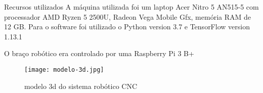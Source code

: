 \begin{frame}[t]{Recursos utilizados} 
    \newcommand\vspacerecursos{0.2cm}
    \transdissolve[duration=0.5]
    A máquina utilizada foi um laptop Acer Nitro 5 AN515-5 com processador AMD Ryzen 5 2500U, Radeon Vega Mobile Gfx, memória RAM de 12 GB. Para o software foi utilizado o Python version 3.7 e TensorFlow version 1.13.1\vspace{\vspacerecursos} 

    O braço robótico era controlado por uma Raspberry Pi 3 B+ \vspace{\vspacerecursos}
    
    \begin{center}
            \begin{figure}
                \texttt{[image: modelo-3d.jpg]}
                \caption{modelo 3d do sistema robótico CNC}
            \end{figure}
    \end{center}
\end{frame}